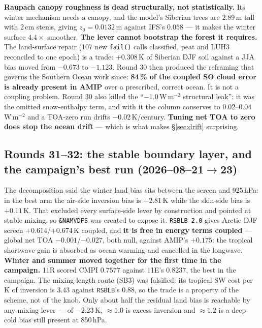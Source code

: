 \documentclass[10pt]{article}
\begin{document}
\textbf{Raupach canopy roughness is dead structurally, not statistically.} Its winter
mechanism needs a canopy, and the model's Siberian trees are $2.89$\,m tall with 2\,cm
stems, giving $z_0=0.0132$\,m against IFS's $0.058$ --- it makes the winter surface
$4.4\times$ smoother. \textbf{The lever cannot bootstrap the forest it requires.} The
land-surface repair (107 new \texttt{fail()} calls classified, peat and LUH3 reconciled to
one epoch) is a trade: $+0.308$\,K of Siberian DJF soil against a JJA bias moved from
$-0.673$ to $-1.123$. Round 30 then produced the reframing
that governs the Southern Ocean work since: \textbf{84\,\% of the coupled SO cloud error is
already present in AMIP} over a prescribed, correct ocean. It is not a coupling problem.
Round 30 also killed the ``$-1.0$\,W\,m$^{-2}$ structural leak'': it was the omitted
snow-enthalpy term, and with it the column conserves to $0.02$--$0.04$\,W\,m$^{-2}$ and a
TOA-zero run drifts $-0.02$\,K/century. \textbf{Tuning net TOA to zero does stop the ocean
drift} --- which is what makes \S\ref{sec:drift} surprising.

\subsection{Rounds 31--32: the stable boundary layer, and the campaign's best run
(2026--08--21$\to$23)}

The decomposition said the winter land bias sits between the screen and 925\,hPa: in the
best arm the air-side inversion bias is $+2.81$\,K while the skin-side bias is $+0.11$\,K.
That excluded every surface-side lever by construction and pointed at stable mixing, so
\texttt{\&NAMVDFS} was created to expose it. \texttt{RSBLB 2.0} gives Arctic DJF screen
$+0.614$/$+0.674$\,K coupled, and \textbf{it is free in energy terms coupled} --- global net
TOA $-0.001$/$-0.027$, both null, against AMIP's $+0.175$: the tropical shortwave gain is
absorbed as ocean warming and cancelled in the longwave. \textbf{Winter and summer moved
together for the first time in the campaign.} 11R scored CMPI $0.7577$ against 11E's
$0.8237$, the best in the campaign. The mixing-length route (SB3) was falsified: its
tropical SW cost per K of inversion is $3.43$ against \texttt{RSBLB}'s $0.88$, so the trade
is a property of the scheme, not of the knob. Only about half the residual land bias is
reachable by any mixing lever --- of $-2.23$\,K, ${\approx}1.0$ is excess inversion and
${\approx}1.2$ is a deep cold bias still present at 850\,hPa.
\end{document}
